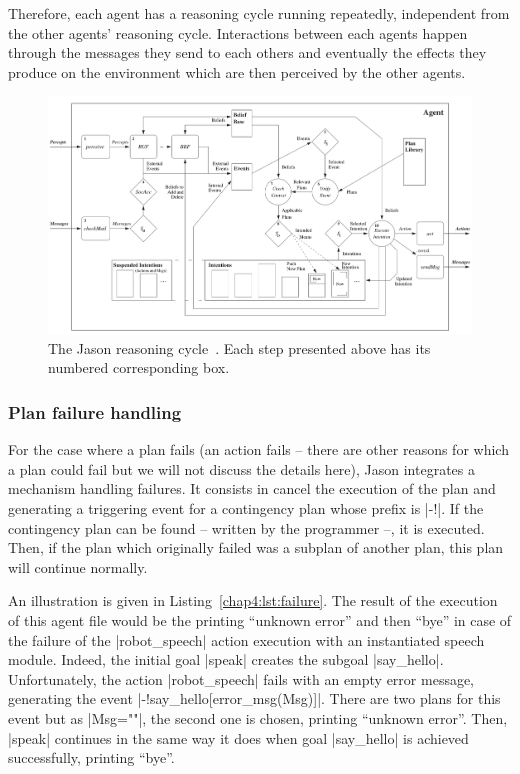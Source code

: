 \documentclass[a4paper,11pt,twoside]{StyleThese}
\begin{document}
Therefore, each agent has a reasoning cycle running repeatedly, independent from the other agents' reasoning cycle. Interactions between each agents happen through the messages they send to each others and eventually the effects they produce on the environment which are then perceived by the other agents. 


\begin{landscape}
\begin{figure}
	\includegraphics[width=\linewidth]{figures/chapter2/jason_cycle.png}
	\caption{The Jason reasoning cycle~\cite{bordini_2007_jason}. Each step presented above has its numbered corresponding box.}
	\label{chap4:fig:jason_cycle}
\end{figure}
\end{landscape}

\subsubsection{Plan failure handling}

For the case where a plan fails (\eg an action fails -- there are other reasons for which a plan could fail but we will not discuss the details here), Jason integrates a mechanism handling failures. It consists in cancel the execution of the plan and generating a triggering event for a contingency plan whose prefix is |-!|. If the contingency plan can be found -- written by the programmer --, it is executed. Then, if the plan which originally failed was a subplan of another plan, this plan will continue normally. 

An illustration is given in Listing~\ref{chap4:lst:failure}. The result of the execution of this agent file would be the printing ``unknown error'' and then ``bye'' in case of the failure of the |robot_speech| action execution with an instantiated speech module. Indeed, the initial goal |speak| creates the subgoal |say_hello|. Unfortunately, the action |robot_speech| fails with an empty error message, generating the event |-!say_hello[error_msg(Msg)]|. There are two plans for this event but as |Msg=""|, the second one is chosen, printing ``unknown error''. Then, |speak| continues in the same way it does when goal |say_hello| is achieved successfully, printing ``bye''.
\end{document}
